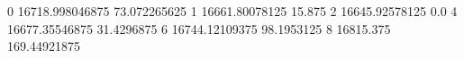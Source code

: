 0 16718.998046875 73.072265625
1 16661.80078125 15.875
2 16645.92578125 0.0
4 16677.35546875 31.4296875
6 16744.12109375 98.1953125
8 16815.375 169.44921875
